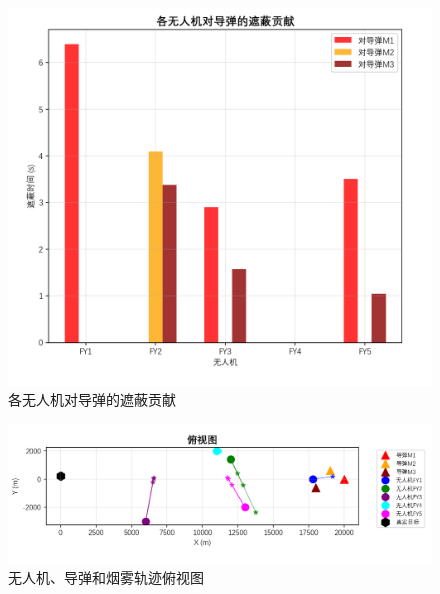 \documentclass[../main.tex]{subfiles}
\begin{document}
\begin{figure}[H]
\centering
\includegraphics[scale=0.45]{问题五可视化图1.png}
\caption{各无人机对导弹的遮蔽贡献}
\label{Figure_11111}
\end{figure}

\begin{figure}[H]
\centering
\includegraphics[scale=0.45]{问题5结果可视化2.png}
\caption{无人机、导弹和烟雾轨迹俯视图}
\label{Figure_12222}
\end{figure}
\end{document}
